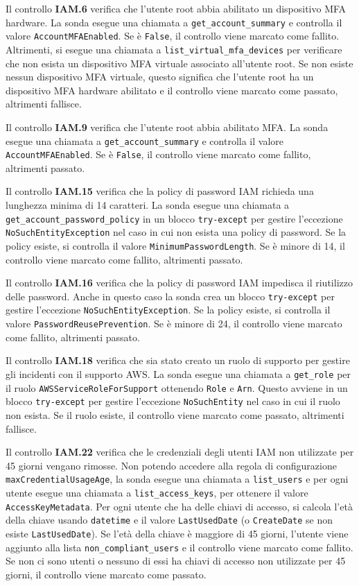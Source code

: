 Il controllo \textbf{IAM.6} verifica che l'utente root abbia abilitato un dispositivo MFA hardware. La sonda esegue una chiamata a \texttt{get\_account\_summary} e controlla il valore \texttt{AccountMFAEnabled}. Se è \texttt{False}, il controllo viene marcato come fallito. Altrimenti, si esegue una chiamata a \texttt{list\_virtual\_mfa\_devices} per verificare che non esista un dispositivo MFA virtuale associato all'utente root. Se non esiste nessun dispositivo MFA virtuale, questo significa che l'utente root ha un dispositivo MFA hardware abilitato e il controllo viene marcato come passato, altrimenti fallisce.

Il controllo \textbf{IAM.9} verifica che l'utente root abbia abilitato MFA. La sonda esegue una chiamata a \texttt{get\_account\_summary} e controlla il valore \texttt{AccountMFAEnabled}. Se è \texttt{False}, il controllo viene marcato come fallito, altrimenti passato.

Il controllo \textbf{IAM.15} verifica che la policy di password IAM richieda una lunghezza minima di 14 caratteri. La sonda esegue una chiamata a \texttt{get\_account\_password\_policy} in un blocco \texttt{try-except} per gestire l'eccezione \texttt{NoSuchEntityException} nel caso in cui non esista una policy di password. Se la policy esiste, si controlla il valore \texttt{MinimumPasswordLength}. Se è minore di 14, il controllo viene marcato come fallito, altrimenti passato.

Il controllo \textbf{IAM.16} verifica che la policy di password IAM impedisca il riutilizzo delle password. Anche in questo caso la sonda crea un blocco \texttt{try-except} per gestire l'eccezione \texttt{NoSuchEntityException}. Se la policy esiste, si controlla il valore \texttt{PasswordReusePrevention}. Se è minore di 24, il controllo viene marcato come fallito, altrimenti passato.

Il controllo \textbf{IAM.18} verifica che sia stato creato un ruolo di supporto per gestire gli incidenti con il supporto AWS. La sonda esegue una chiamata a \texttt{get\_role} per il ruolo \texttt{AWSServiceRoleForSupport} ottenendo \texttt{Role} e \texttt{Arn}. Questo avviene in un blocco \texttt{try-except} per gestire l'eccezione \texttt{NoSuchEntity} nel caso in cui il ruolo non esista. Se il ruolo esiste, il controllo viene marcato come passato, altrimenti fallisce.

Il controllo \textbf{IAM.22} verifica che le credenziali degli utenti IAM non utilizzate per 45 giorni vengano rimosse. Non potendo accedere alla regola di configurazione \texttt{maxCredentialUsageAge}, la sonda esegue una chiamata a \texttt{list\_users} e per ogni utente esegue una chiamata a \texttt{list\_access\_keys}, per ottenere il valore \texttt{AccessKeyMetadata}. Per ogni utente che ha delle chiavi di accesso, si calcola l'età della chiave usando \texttt{datetime} e il valore \texttt{LastUsedDate} (o \texttt{CreateDate} se non esiste \texttt{LastUsedDate}). Se l'età della chiave è maggiore di 45 giorni, l'utente viene aggiunto alla lista \texttt{non\_compliant\_users} e il controllo viene marcato come fallito. Se non ci sono utenti o nessuno di essi ha chiavi di accesso non utilizzate per 45 giorni, il controllo viene marcato come passato.

